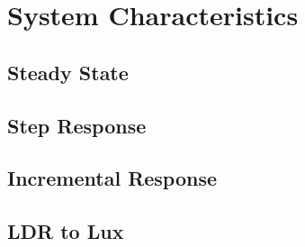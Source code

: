 \section{System Characteristics}
\label{sec:SystemCharacteristics}

\subsection{Steady State}
\label{sub:SteadyState}

\subsection{Step Response}
\label{sub:StepResponse}

\subsection{Incremental Response}
\label{sub:IncrementalResponse}

\subsection{LDR to Lux}
\label{sub:LDRtoLux}
